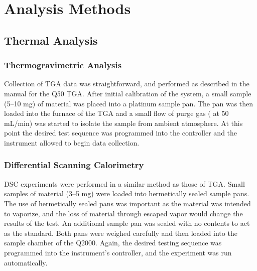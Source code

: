 \chapter{Analysis Methods}
\label{ch:Methods}
\thispagestyle{empty}



\section{Thermal Analysis}
\label{sec:Methods-Thermal}


\subsection{Thermogravimetric Analysis}

Collection of TGA data was straightforward, and performed as described in the manual for the Q50 TGA. After initial calibration of the system, a small sample (5--10 mg) of material was placed into a platinum sample pan. The pan was then loaded into the furnace of the TGA and a small flow of purge gas ( at 50 mL/min) was started to isolate the sample from ambient atmosphere. At this point the desired test sequence was programmed into the controller and the instrument allowed to begin data collection. 


\subsection{Differential Scanning Calorimetry}

DSC experiments were performed in a similar method as those of TGA. Small samples of material (3--5 mg) were loaded into hermetically sealed sample pans. The use of hermetically sealed pans was important as the material was intended to vaporize, and the loss of material through escaped vapor would change the results of the test. An additional sample pan was sealed with no contents to act as the standard. Both pans were weighed carefully and then loaded into the sample chamber of the Q2000. Again, the desired testing sequence was programmed into the instrument's controller, and the experiment was run automatically. 


